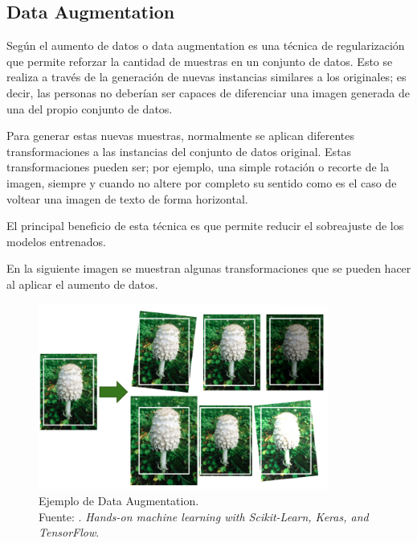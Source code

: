 \subsection{Data Augmentation}

Según \cite{bk_geron2022handml} el aumento de datos o data augmentation es una técnica de regularización que permite reforzar la cantidad de muestras en un conjunto de datos. Esto se realiza a través de la generación de nuevas instancias similares a los originales; es decir, las personas no deberían ser capaces de diferenciar una imagen generada de una del propio conjunto de datos.

Para generar estas nuevas muestras, normalmente se aplican diferentes transformaciones a las instancias del conjunto de datos original. Estas transformaciones pueden ser; por ejemplo, una simple rotación o recorte de la imagen, siempre y cuando no altere por completo su sentido como es el caso de voltear una imagen de texto de forma horizontal. 

El principal beneficio de esta técnica es que permite reducir el sobreajuste de los modelos entrenados. 

En la siguiente imagen se muestran algunas transformaciones que se pueden hacer al aplicar el aumento de datos. 

\begin{figure}[H]
	\begin{center}
		\includegraphics[width=0.85\textwidth]{2/figures/data_aug.PNG}
		\caption[Ejemplo de Data Augmentation]{Ejemplo de Data Augmentation. \\
		Fuente: \cite{bk_geron2022handml}. \textit{Hands-on machine learning with Scikit-Learn, Keras, and TensorFlow}.}
		\label{2:fig211}
	\end{center}
\end{figure}

